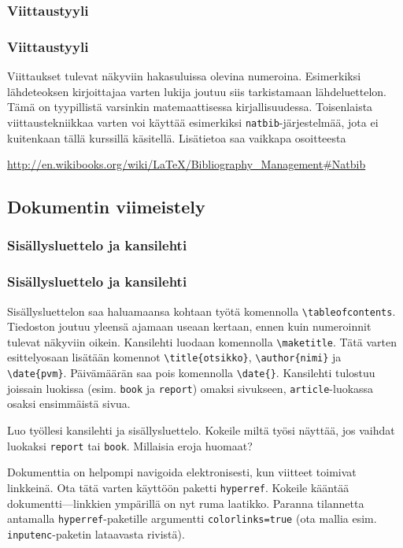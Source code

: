\subsubsection{Viittaustyyli}
\begin{frame}[fragile]
    \frametitle{Viittaustyyli}
    Viittaukset tulevat näkyviin hakasuluissa olevina numeroina. Esimerkiksi lähdeteoksen kirjoittajaa varten lukija joutuu siis tarkistamaan lähdeluettelon. Tämä on tyypillistä varsinkin matemaattisessa kirjallisuudessa. 
    \vaihto
    Toisenlaista viittaustekniikkaa varten voi käyttää esimerkiksi \verb-natbib--järjestelmää, jota ei kuitenkaan tällä kurssillä käsitellä. Lisätietoa saa vaikkapa osoitteesta
    \begin{scriptsize}
        \url{http://en.wikibooks.org/wiki/LaTeX/Bibliography_Management#Natbib}
    \end{scriptsize}
\end{frame}
\subsection{Dokumentin viimeistely}
\subsubsection{Sisällysluettelo ja kansilehti}
\begin{frame}[fragile]
    \frametitle{Sisällysluettelo ja kansilehti}
    Sisällysluettelon saa haluamaansa kohtaan työtä komennolla \verb-\tableofcontents-. Tiedoston joutuu yleensä ajamaan useaan kertaan, ennen kuin numeroinnit tulevat näkyviin oikein.
    \vaihto
    Kansilehti luodaan komennolla \verb-\maketitle-. Tätä varten esittelyosaan lisätään komennot \verb-\title{otsikko}-, \verb-\author{nimi}- ja \verb-\date{pvm}-. Päivämäärän saa pois komennolla \verb-\date{}-.
    \vaihto
    Kansilehti tulostuu joissain luokissa (esim. \verb-book- ja \verb-report-) omaksi sivukseen, \verb-article--luokassa osaksi ensimmäistä sivua.
\end{frame}
\begin{frame}[fragile]
    \begin{harj}
        Luo työllesi kansilehti ja sisällysluettelo. Kokeile miltä työsi näyttää, jos vaihdat luokaksi \verb-report- tai \verb-book-. Millaisia eroja huomaat? 
    \end{harj}
    \begin{harj}
        Dokumenttia on helpompi navigoida elektronisesti, kun viitteet toimivat linkkeinä. Ota tätä varten käyttöön paketti \verb-hyperref-. Kokeile kääntää dokumentti---linkkien ympärillä on nyt ruma laatikko. Paranna tilannetta antamalla \verb-hyperref--paketille argumentti \verb-colorlinks=true- (ota mallia esim. \verb-inputenc--paketin lataavasta rivistä).
    \end{harj}
\end{frame}
